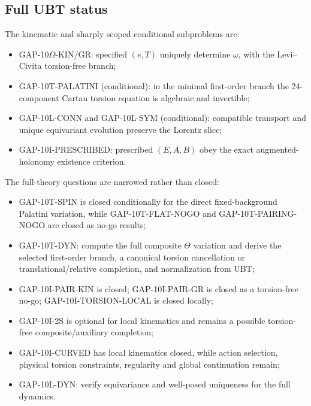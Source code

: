 \subsection{Full UBT status}
The kinematic and sharply scoped conditional subproblems are:
\begin{itemize}
 \item GAP-10$\Omega$-KIN/GR: specified $(e,T)$ uniquely determine $\omega$,
       with the Levi--Civita torsion-free branch;
 \item GAP-10T-PALATINI (conditional): in the minimal first-order branch the
       24-component Cartan torsion equation is algebraic and invertible;
 \item GAP-10L-CONN and GAP-10L-SYM (conditional): compatible transport and
       unique equivariant evolution preserve the Lorentz slice;
 \item GAP-10I-PRESCRIBED: prescribed $(E,A,B)$ obey the exact
       augmented-holonomy existence criterion.
\end{itemize}
The full-theory questions are narrowed rather than closed:
\begin{itemize}
 \item GAP-10T-SPIN is closed conditionally for the direct fixed-background
       Palatini variation, while GAP-10T-FLAT-NOGO and
       GAP-10T-PAIRING-NOGO are closed as no-go results;
 \item GAP-10T-DYN: compute the full composite $\Theta$ variation and derive
       the selected first-order branch, a canonical torsion cancellation or
       translational/relative completion, and normalization from UBT;
 \item GAP-10I-PAIR-KIN is closed; GAP-10I-PAIR-GR is closed as a
       torsion-free no-go; GAP-10I-TORSION-LOCAL is closed locally;
 \item GAP-10I-2S is optional for local kinematics and remains a possible
       torsion-free composite/auxiliary completion;
 \item GAP-10I-CURVED has local kinematics closed, while action selection,
       physical torsion constraints, regularity and global continuation remain;
 \item GAP-10L-DYN: verify equivariance and well-posed uniqueness for the full
       dynamics.
\end{itemize}
